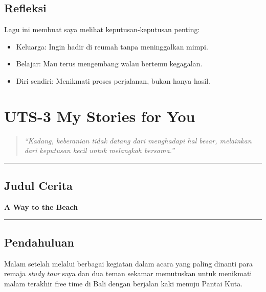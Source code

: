 \documentclass[
  letterpaper,
  DIV=11,
  numbers=noendperiod]{scrreprt}
\providecommand{\tightlist}{%
  \setlength{\itemsep}{0pt}\setlength{\parskip}{0pt}}
\begin{document}
\section{Refleksi}\label{refleksi}

Lagu ini membuat saya melihat keputusan-keputusan penting:

\begin{itemize}
\tightlist
\item
  Keluarga: Ingin hadir di reumah tanpa meninggalkan mimpi.
\item
  Belajar: Mau terus mengembang walau bertemu kegagalan.
\item
  Diri sendiri: Menikmati proses perjalanan, bukan hanya hasil.
\end{itemize}


\chapter{UTS-3 My Stories for You}\label{uts-3-my-stories-for-you}

\begin{quote}
\emph{``Kadang, keberanian tidak datang dari menghadapi hal besar,
melainkan dari keputusan kecil untuk melangkah bersama.''}
\end{quote}

\begin{center}\rule{0.5\linewidth}{0.5pt}\end{center}

\section{Judul Cerita}\label{judul-cerita}

\textbf{A Way to the Beach}

\begin{center}\rule{0.5\linewidth}{0.5pt}\end{center}

\section{Pendahuluan}\label{pendahuluan}

Malam setelah melalui berbagai kegiatan dalam acara yang paling dinanti
para remaja \emph{study tour} saya dan dua teman sekamar memutuskan
untuk menikmati malam terakhir free time di Bali dengan berjalan kaki
menuju Pantai Kuta.
\end{document}
